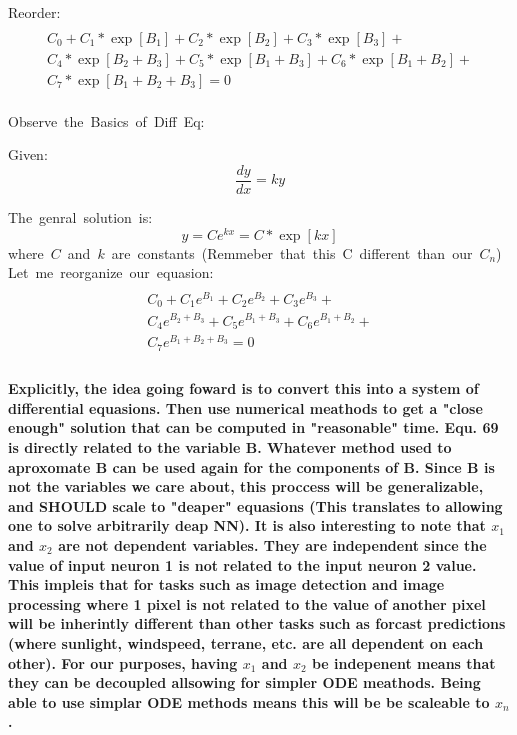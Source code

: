 \documentclass{article}
\begin{document}
\hbox{Reorder:}
\begin{multline}\\
    C_0 + C_1*\exp[B_1] + C_2*\exp[B_2] + C_3*\exp[B_3] +\\
    C_4*\exp[B_2+B_3] + C_5*\exp[B_1+B_3] + C_6*\exp[B_1+B_2] +\\
    C_7*\exp[B_1+B_2+B_3] = 0\\
\end{multline}

\hbox{Observe the Basics of Diff Eq:}

\hbox{Given:}
\begin{equation}
    \frac{dy}{dx} = ky
\end{equation}

\hbox{The genral solution is:}
\begin{equation}
    y = Ce^{kx} = C*\exp[kx]
\end{equation}
\hbox{where $C$ and $k$ are constants (Remmeber that this C different than our $C_n$)}\\

\hbox{Let me reorganize our equasion:}
\begin{multline}\\
    C_0 + C_1e^{B_1} + C_2e^{B_2} + C_3e^{B_3} +\\
    C_4e^{B_2+B_3} + C_5e^{B_1+B_3} + C_6e^{B_1+B_2} +\\
    C_7e^{B_1+B_2+B_3} = 0\\
\end{multline}


\paragraph{Explicitly, the idea going foward is to convert this into a system of differential equasions. Then use numerical meathods to get a 
"close enough" solution that can be computed in "reasonable" time.  Equ. 69 is directly related to the variable B. Whatever method used
to aproxomate B can be used again for the components of B. Since B is not the variables we care about, this proccess will be generalizable,
and SHOULD scale to "deaper" equasions (This translates to allowing one to solve arbitrarily deap NN). It is also interesting to note that 
$x_1$ and $x_2$ are not dependent variables. They are independent since the value of input neuron 1 is not related to the input neuron 2 value.
This impleis that for tasks such as image detection and image processing where 1 pixel is not related to the value of another pixel will be 
inherintly different than other tasks such as forcast predictions (where sunlight, windspeed, terrane, etc. are all dependent on each other).
For our purposes, having $x_1$ and $x_2$ be indepenent means that they can be decoupled allsowing for simpler ODE meathods. Being able to
use simplar ODE methods means this will be be scaleable to $x_n$.}
\end{document}
